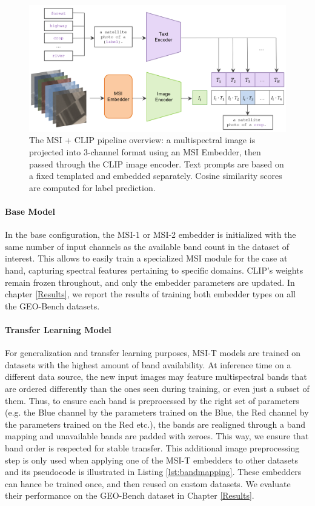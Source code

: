 \documentclass[a4paper, oneside, english]{sapthesis} %
\begin{document}
\begin{figure}[h]
\centering
\includegraphics[width=\textwidth]{img/msi_clip_pipeline.png}
\caption{The MSI + CLIP pipeline overview: a multispectral image is projected into 3-channel format using an MSI Embedder, then passed through the CLIP image encoder. Text prompts are based on a fixed templated and embedded separately. Cosine similarity scores are computed for label prediction.}
\label{fig:model_pipeline}
\end{figure}



\paragraph{Base Model} In the base configuration, the MSI-1 or MSI-2 embedder is initialized with the same number of input channels as the available band count in the dataset of interest. This allows to easily train a specialized MSI module for the case at hand, capturing spectral features pertaining to specific domains. CLIP’s weights remain frozen throughout, and only the embedder parameters are updated. In chapter \ref{Results}, we report the results of training both embedder types on all the GEO-Bench datasets.

\paragraph{Transfer Learning Model} For generalization and transfer learning purposes, MSI-T models are trained on datasets with the highest amount of band availability. At inference time on a different data source, the new input images may feature multispectral bands that are ordered differently than the ones seen during training, or even just a subset of them. Thus, to ensure each band is preprocessed by the right set of parameters (e.g. the Blue channel by the parameters trained on the Blue, the Red channel by the parameters trained on the Red etc.), the bands are realigned through a band mapping and unavailable bands are padded with zeroes. This way, we ensure that band order is respected for stable transfer. This additional image preprocessing step is only used when applying one of the MSI-T embedders to other datasets and its pseudocode is illustrated in Listing \ref{lst:bandmapping}. These embedders can hance be trained once, and then reused on custom datasets. We evaluate their performance on the GEO-Bench dataset in Chapter \ref{Results}.
\end{document}
